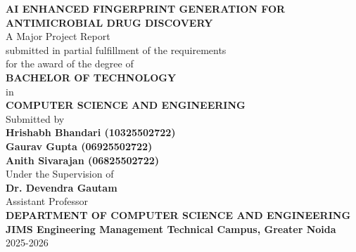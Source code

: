 \documentclass[12pt, a4paper]{report}
\begin{document}
\begin{titlepage}
\thispagestyle{empty}

\begin{center}
    \vspace*{2cm}
    {\fontsize{18}{21.6}\bfseries \MakeUppercase{AI Enhanced Fingerprint Generation for Antimicrobial Drug Discovery}}\\[1.5cm]
    {\fontsize{14}{16.8} A Major Project Report}\\[0.5cm]
    {\fontsize{12}{14.4} submitted in partial fulfillment of the requirements}\\[0.5cm]
    {\fontsize{12}{14.4} for the award of the degree of}\\[1.5cm]
    {\fontsize{14}{16.8}\bfseries BACHELOR OF TECHNOLOGY}\\[0.5cm]
    {\fontsize{12}{14.4} in}\\[0.5cm]
    {\fontsize{14}{16.8}\bfseries COMPUTER SCIENCE AND ENGINEERING}\\[1.5cm]
    {\fontsize{12}{14.4} Submitted by}\\[0.5cm]
    {\fontsize{14}{16.8}\bfseries Hrishabh Bhandari (10325502722)}\\
    {\fontsize{14}{16.8}\bfseries Gaurav Gupta (06925502722)}\\
    {\fontsize{14}{16.8}\bfseries Anith Sivarajan (06825502722)}\\[1.5cm]
    {\fontsize{12}{14.4} Under the Supervision of}\\[0.5cm]
    {\fontsize{14}{16.8}\bfseries Dr. Devendra Gautam}\\[0.5cm]
    {\fontsize{12}{14.4} Assistant Professor}\\[2cm]
    {\fontsize{14}{16.8}\bfseries DEPARTMENT OF COMPUTER SCIENCE AND ENGINEERING}\\[0.5cm]
    {\fontsize{14}{16.8}\bfseries JIMS Engineering Management Technical Campus, Greater Noida}\\[0.5cm]
    {\fontsize{12}{14.4} 2025-2026}
\end{center}
\end{titlepage}



\end{document}
